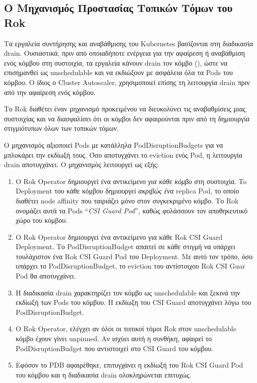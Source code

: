 \subsection{Ο Μηχανισμός Προστασίας Τοπικών Τόμων του Rok}
\label{section:background-gr-rok-csi-guard}


Τα εργαλεία συντήρησης και αναβάθμισης του Kubernetes βασίζονται στη διαδικασία
drain. Ουσιαστικά, πριν από οποιαδήποτε ενέργεια για την αφαίρεση ή αναβάθμιση
ενός κόμβου στη συστοιχία, τα εργαλεία κάνουν drain τον κόμβο (), ώστε να επισημανθεί ως unschedulable και να εκδιώξουν με ασφάλεια όλα
τα Pods του κόμβου. Ο ίδιος ο Cluster Autoscaler, χρησιμοποιεί επίσης τη
λειτουργία drain πριν από την αφαίρεση ενός κόμβου.

Το Rok διαθέτει έναν μηχανισμό προκειμένου να διευκολύνει τις αναβαθμίσεις μιας
συστοιχίας και να διασφαλίσει ότι οι κόμβοι δεν αφαιρούνται πριν από τη
δημιουργία στιγμιότυπων όλων των τοπικών τόμων.

Ο μηχανισμός αξιοποιεί Pods με κατάλληλα PodDisruptionBudgets για να μπλοκάρει
την εκδίωξή τους. Όσο αποτυγχάνει το eviction ενός Pod, η λειτουργία drain
αποτυγχάνει. Ο μηχανισμός λειτουργεί ως εξής:

\begin{enumerate}
      \tightlist
      \item Ο Rok Operator δημιουργεί ένα αντικείμενο 
            \textit{για κάθε κόμβο} στη συστοιχία. To Deployment του κάθε κόμβου
            δημιουργεί \textit{ακριβώς ένα} replica Pod, το οποίο διαθέτει node
            affinity που ταιριάζει μόνο στον συγκεκριμένο κόμβο. Το Rok ονομάζει
            αυτά τα Pods ``\textit{CSI Guard Pod}'', καθώς φυλάσσουν τον
            αποθηκευτικό χώρο του κόμβου.
      \item Ο Rok Operator δημιουργεί ένα αντικείμενο 
            για κάθε Rok CSI Guard Deployment. Το PodDisruptionBudget απαιτεί σε
            κάθε στιγμή να υπάρχει τουλάχιστον ένα Rok CSI Guard Pod του
            Deployment. Με αυτό τον τρόπο, όσο υπάρχει το PodDisruptionBudget,
            το eviction του αντίστοιχου Rok CSI Guar Pod θα αποτυγχάνει.
      \item Η διαδικασία drain χαρακτηρίζει τον κόμβο ως unschedulable και
            ξεκινά την εκδίωξή των Pods του κόμβου. Η εκδίωξη του CSI Guard
            αποτυγχάνει λόγω του PodDisruptionBudget.
      \item Ο Rok Operator, ελέγχει αν όλοι οι τοπικοί τόμοι Rok στον
            unschedulable  κόμβο έχουν γίνει unpinned.  Αν ισχύει αυτή η
            συνθήκη, αφαιρεί το PodDisruptionBudget που αντιστοιχεί στο CSI
            Guard του κόμβου.
      \item Εφόσον το PDB αφαιρέθηκε, επιτυγχάνει η εκδίωξή του Rok CSI Guard
            Pod του κόμβου και η διαδικασία drain ολοκληρώνεται επιτυχώς.
\end{enumerate}
